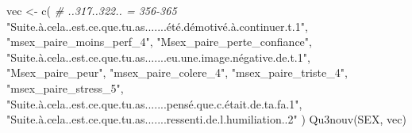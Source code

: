 \documentclass[
]{article}
\newenvironment{Shaded}{\begin{snugshade}}{\end{snugshade}}
\newcommand{\CommentTok}[1]{\textcolor[rgb]{0.56,0.35,0.01}{\textit{#1}}}
\newcommand{\FunctionTok}[1]{\textcolor[rgb]{0.00,0.00,0.00}{#1}}
\newcommand{\NormalTok}[1]{#1}
\newcommand{\OtherTok}[1]{\textcolor[rgb]{0.56,0.35,0.01}{#1}}
\newcommand{\StringTok}[1]{\textcolor[rgb]{0.31,0.60,0.02}{#1}}
\begin{document}
\begin{Shaded}
\begin{Highlighting}[]
\NormalTok{vec }\OtherTok{\textless{}{-}} \FunctionTok{c}\NormalTok{(  }\CommentTok{\# ..317..322.. = 356{-}365}
  \StringTok{"Suite.à.cela..est.ce.que.tu.as.......été.démotivé.à.continuer.t.1"}\NormalTok{,}
  \StringTok{"msex\_paire\_moins\_perf\_4"}\NormalTok{,}
  \StringTok{"Msex\_paire\_perte\_confiance"}\NormalTok{,}
  \StringTok{"Suite.à.cela..est.ce.que.tu.as.......eu.une.image.négative.de.t.1"}\NormalTok{,}
  \StringTok{"Msex\_paire\_peur"}\NormalTok{,}
  \StringTok{"msex\_paire\_colere\_4"}\NormalTok{,}
  \StringTok{"msex\_paire\_triste\_4"}\NormalTok{,}
  \StringTok{"msex\_paire\_stress\_5"}\NormalTok{,}
  \StringTok{"Suite.à.cela..est.ce.que.tu.as.......pensé.que.c.était.de.ta.fa.1"}\NormalTok{,}
  \StringTok{"Suite.à.cela..est.ce.que.tu.as.......ressenti.de.l.humiliation..2"}
\NormalTok{  )}
\FunctionTok{Qu3nouv}\NormalTok{(SEX, vec)}
\end{Highlighting}
\end{Shaded}
\end{document}

